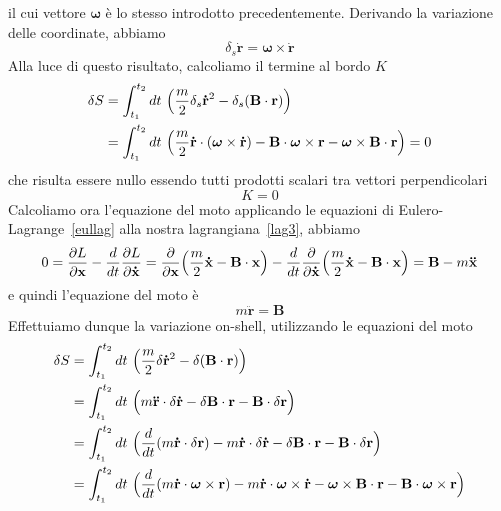 \begin{example}
\begin{equation}
    \end{equation}
        il cui vettore $\boldsymbol \omega$ è lo stesso introdotto precedentemente. Derivando la variazione delle coordinate, abbiamo
    \begin{equation}
        \delta_s \mathbf{\dot r} = \boldsymbol \omega \times \mathbf{\dot r}
    \end{equation}
        Alla luce di questo risultato, calcoliamo il termine al bordo $K$ 
    \begin{equation}
    \begin{aligned}
        \delta S & = \int_{t_1}^{t_2}dt~ \Big( \frac{m}{2} \delta_s \mathbf{\dot r}^2 - \delta_s (\mathbf B \cdot \mathbf r ) \Big ) \\ & = \int_{t_1}^{t_2}dt~ \Big( \frac{m}{2} \mathbf{\dot r} \cdot (\boldsymbol \omega \times \mathbf{\dot r} ) - \mathbf B \cdot \boldsymbol \omega \times \mathbf r - \boldsymbol \omega \times \mathbf B \cdot \mathbf r \Big ) = 0
    \end{aligned}
    \end{equation}
        che risulta essere nullo essendo tutti prodotti scalari tra vettori perpendicolari
    \begin{equation*}
        K = 0
    \end{equation*}
        Calcoliamo ora l'equazione del moto applicando le equazioni di Eulero-Lagrange~\eqref{eullag} alla nostra lagrangiana~\eqref{lag3}, abbiamo
    \begin{equation*}
        0 = \frac{\partial L}{\partial\mathbf x} - \frac{d}{dt} \frac{\partial L}{\partial\mathbf{\dot x}} = \frac{\partial}{\partial\mathbf x} \Big(\frac{m}{2} \mathbf{\dot x} - \mathbf B \cdot \mathbf x \Big) - \frac{d}{dt} \frac{\partial}{\partial\mathbf{\dot x}} \Big(\frac{m}{2} \mathbf{\dot x} - \mathbf B \cdot \mathbf x \Big) = \mathbf B - m \mathbf{\ddot x}
    \end{equation*}
        e quindi l'equazione del moto è
    \begin{equation}\label{eqmoto3}
        m \mathbf{\ddot r} = \mathbf B
    \end{equation}
        Effettuiamo dunque la variazione on-shell, utilizzando le equazioni del moto
    \begin{equation*}
    \begin{aligned}
        \delta S & = \integ{t_1}{t_2}{t} \Big( \frac{m}{2} \delta \mathbf{\dot r}^2 - \delta (\mathbf B \cdot \mathbf r ) \Big ) \\ & = \integ{t_1}{t_2}{t} \Big( m \mathbf{\ddot r } \cdot \delta \mathbf{\dot r} - \delta \mathbf B \cdot \mathbf r - \mathbf B \cdot \delta \mathbf r \Big )  \\ & = \integ{t_1}{t_2}{t} \Big( \dv{}{t} (m \mathbf{\dot r} \cdot \delta \mathbf r) - m \mathbf{\dot r} \cdot \delta \mathbf{\dot r} - \delta \mathbf B \cdot \mathbf r - \mathbf B \cdot \delta \mathbf r \Big )  \\ & = \integ{t_1}{t_2}{t} \Big( \dv{}{t} (m \mathbf{\dot r} \cdot \boldsymbol \omega \times \mathbf r) - m \mathbf{\dot r} \cdot \boldsymbol \omega \times \mathbf{\dot r} - \boldsymbol \omega \times \mathbf B \cdot \mathbf r - \mathbf B \cdot \boldsymbol \omega \times \mathbf r \Big ) 

\end{aligned}
\end{equation*}
\end{example}
